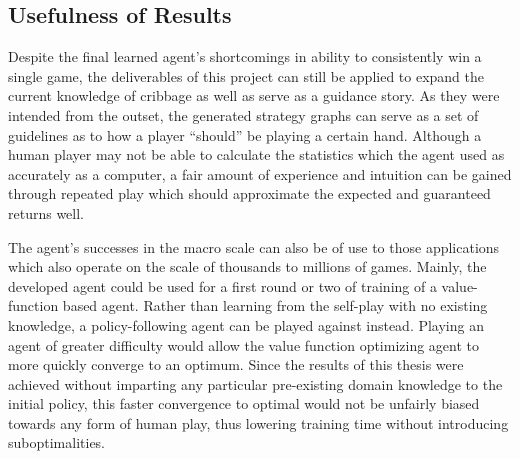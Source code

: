 
\subsection{Usefulness of Results}


Despite the final learned agent's shortcomings in ability to consistently win
a single game,
the deliverables of this project can still be applied to expand the current
knowledge of cribbage as well as serve as a guidance story.
%
As they were intended from the outset,
the generated strategy graphs can serve as a set of guidelines as to how a
player ``should'' be playing a certain hand.
%
Although a human player may not be able to calculate the statistics which the
agent used as accurately as a computer,
a fair amount of experience and intuition can be gained through repeated
play which should approximate the expected and guaranteed returns well.

The agent's successes in the macro scale can also be of use to those
applications which also operate on the scale of thousands to millions of games.
%
Mainly,
the developed agent could be used for a first round or two of training
of a value-function based agent.
%
Rather than learning from the self-play with no existing knowledge,
a policy-following agent can be played against instead.
%
Playing an agent of greater difficulty would allow the value function optimizing
agent to more quickly converge to an optimum.
%
Since the results of this thesis were achieved without imparting any particular 
pre-existing domain knowledge to the initial policy,
this faster convergence to optimal would not be unfairly biased
towards any form of human play,
thus lowering training time without introducing suboptimalities.

%
